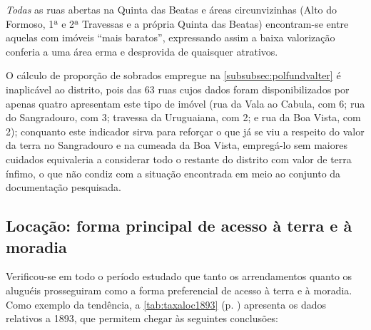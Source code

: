 \textit{Todas} as ruas abertas na Quinta das Beatas e áreas circunvizinhas (Alto do Formoso, 1ª e 2ª Travessas e a própria Quinta das Beatas) encontram-se entre aquelas com imóveis ``mais baratos'', expressando assim a baixa valorização conferia a uma área erma e desprovida de quaisquer atrativos.

O cálculo de proporção de sobrados empregue na \autoref{subsubsec:polfundvalter} é inaplicável ao distrito, pois das 63 ruas cujos dados foram disponibilizados por  apenas quatro apresentam este tipo de imóvel (rua da Vala ao Cabula, com 6; rua do Sangradouro, com 3; travessa da Uruguaiana, com 2; e rua da Boa Vista, com 2); conquanto este indicador sirva para reforçar o que já se viu a respeito do valor da terra no Sangradouro e na cumeada da Boa Vista, empregá-lo sem maiores cuidados equivaleria a considerar todo o restante do distrito com valor de terra ínfimo, o que não condiz com a situação encontrada em meio ao conjunto da documentação pesquisada. 

\subsection{Locação: forma principal de acesso à terra e à moradia}\label{subsec:locatermor}

Verificou-se em todo o período estudado que tanto os arrendamentos quanto os aluguéis prosseguiram como a forma preferencial de acesso à terra e à moradia. Como exemplo da tendência, a \autoref{tab:taxaloc1893} (p. \pageref{tab:taxaloc1893}) apresenta os dados relativos a 1893, que permitem chegar às seguintes conclusões:

\afterpage{

}

